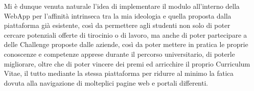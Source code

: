 Mi è dunque venuta naturale l'idea di implementare il modulo all'interno della WebApp per l'affinità intrinseca tra la mia ideologia e quella proposta dalla piattaforma già esistente, così da permettere agli studenti non solo di poter cercare potenziali offerte di tirocinio o di lavoro, ma anche di poter partecipare a delle Challenge proposte dalle aziende, così da poter mettere in pratica le proprie conoscenze e competenze apprese durante il percorso universitario, di poterle migliorare, oltre che di poter vincere dei premi ed arricchire il proprio Curriculum Vitae, il tutto mediante la stessa piattaforma per ridurre al minimo la fatica dovuta alla navigazione di molteplici pagine web e portali differenti.



